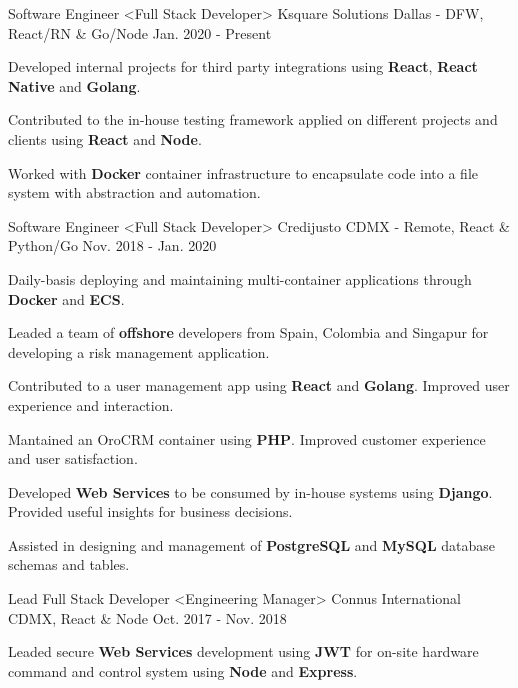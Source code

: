 \begin{cventries}
  \cventry
    {Software Engineer <Full Stack Developer>}
    {Ksquare Solutions}
    {Dallas - DFW, React/RN \& Go/Node}
    {Jan. 2020 - Present}
    {
      \begin{cvitems}
        \item {Developed internal projects for third party integrations using \textbf{React}, \textbf{React Native} and \textbf{Golang}.}
        \item {Contributed to the in-house testing framework applied on different projects and clients using \textbf{React} and \textbf{Node}.}
        \item {Worked with \textbf{Docker} container infrastructure to encapsulate code into a file system with abstraction and automation.}
      \end{cvitems}
    }
  \cventry
    {Software Engineer <Full Stack Developer>}
    {Credijusto}
    {CDMX - Remote, React \& Python/Go}
    {Nov. 2018 - Jan. 2020}
    {
      \begin{cvitems}
        \item {Daily-basis deploying and maintaining multi-container applications through \textbf{Docker} and \textbf{ECS}.}
        \item {Leaded a team of \textbf{offshore} developers from Spain, Colombia and Singapur for developing a risk management application.}
        \item {Contributed to a user management app using \textbf{React} and \textbf{Golang}. Improved user experience and interaction.}
        \item {Mantained an OroCRM container using \textbf{PHP}. Improved customer experience and user satisfaction.}
        \item {Developed \textbf{Web Services} to be consumed by in-house systems using \textbf{Django}. Provided useful insights for business decisions.}
        \item {Assisted in designing and management of \textbf{PostgreSQL} and \textbf{MySQL} database schemas and tables.}
      \end{cvitems}
    }
  \cventry
    {Lead Full Stack Developer <Engineering Manager>}
    {Connus International}
    {CDMX, React \& Node}
    {Oct. 2017 - Nov. 2018}
    {
      \begin{cvitems}
        \item {Leaded secure \textbf{Web Services} development using \textbf{JWT} for on-site hardware command and control system using \textbf{Node} and \textbf{Express}.}

\end{cvitems}}
\end{cventries}
